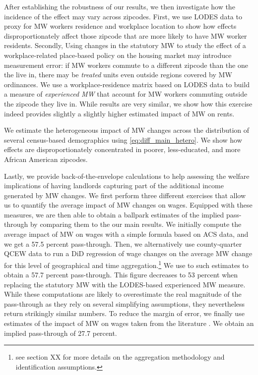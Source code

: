 After establishing the robustness of our results, we then investigate how the incidence of the 
effect may vary across zipcodes. First, we use LODES data to proxy for MW workers residence and workplace 
location to show how effects disproportionately affect those zipcode that are more likely to have 
MW worker residents. Secondly, Using changes in the statutory MW to study the effect of a workplace-related 
place-based policy on the housing market may introduce measurement error: if MW workers 
commute to a different zipcode than the one the live in, there may be \textit{treated} units even 
outside regions covered by MW ordinances.  We use a workplace-residence matrix based on LODES 
data to build a measure of \textit{experienced MW} that account for MW workers commuting outside the zipcode
they live in. While results are very similar, we show how this exercise indeed provides slightly a slightly higher 
estimated impact of MW on rents. 
  
We estimate the heterogeneous impact of MW changes across the 
distribution of several census-based demographics using \autoref{eq:diff_main_hetero}. We show how 
effects are disproportionately concentrated in poorer, less-educated, and more 
African American zipcodes. 

Lastly, we provide back-of-the-envelope calculations to help assessing the welfare implications of 
having landlords capturing part of the additional income generated by MW changes. We first perform three
different exercises that allow us to quantify the average impact of MW changes on wages. Equipped with these 
measures, we are then able to obtain a ballpark estimates of the implied pass-through by comparing them to 
the our main results. We initially compute the average impact of MW on wages with a simple formula based on 
ACS data, and we get a 57.5 percent pass-through. Then, we alternatively use county-quarter QCEW data to run a 
DiD regression of wage changes on the average MW change for this level of geographical and time aggregation.\footnote{see 
	section XX for more details on the aggregation methodology and identification assumptions.} 
We use to such estimates to obtain a 57.7 percent pass-through. This figure decreases to 53
percent when replacing the statutory MW with the LODES-based experienced MW measure. While these computations are
likely to overestimate the real magnitude of the pass-through as they rely on several simplifying assumptions, they 
nevertheless return strikingly similar numbers. To reduce the margin of error,  we finally use estimates of the impact of MW 
on wages taken from the literature \parencite{CegnizEtAl2019}. We obtain an implied pass-through of 27.7 percent. 


